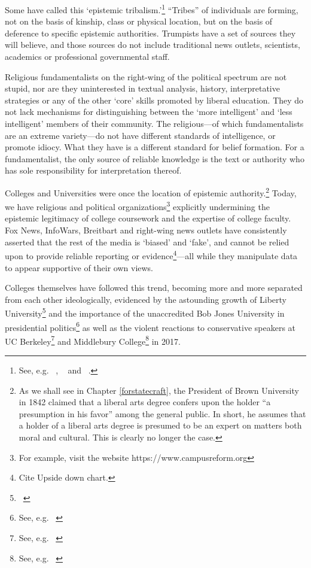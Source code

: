 Some have called this `epistemic tribalism.'\footnote{See, e.g. ~\citep{Spencer:2013hm}, ~\citep{Brayton:2017up} and ~\citep{Roberts:2017up}.} ``Tribes'' of individuals are forming, not on the basis of kinship, class or physical location, but on the basis of deference to specific epistemic authorities. Trumpists have a set of sources they will believe, and those sources do not include traditional news outlets, scientists, academics or professional governmental staff.

Religious fundamentalists on the right-wing of the political spectrum are not stupid, nor are they uninterested in textual analysis, history, interpretative strategies or any of the other `core' skills promoted by liberal education. They do not lack mechanisms for distinguishing between the `more intelligent' and `less intelligent' members of their community. The religious---of which fundamentalists are an extreme variety---do not have different standards of intelligence, or promote idiocy. What they have is a different standard for belief formation. For a fundamentalist, the only source of reliable knowledge is the text or authority who has sole responsibility for interpretation thereof. 

Colleges and Universities were once the location of epistemic authority.\footnote{As we shall see in Chapter \ref{forstatecraft}, the President of Brown University in 1842 claimed that a liberal arts degree confers upon the holder ``a presumption in his favor'' among the general public. In short, he assumes that a holder of a liberal arts degree is presumed to be an expert on matters both moral and cultural. This is clearly no longer the case.} Today, we have religious and political organizations\footnote{For example, visit the website https:\slash \slash www.campusreform.org} explicitly undermining the epistemic legitimacy of college coursework and the expertise of college faculty. Fox News, InfoWars, Breitbart and right-wing news outlets have consistently asserted that the rest of the media is `biased' and `fake', and cannot be relied upon to provide reliable reporting or evidence\footnote{Cite Upside down chart.}---all while they manipulate data to appear supportive of their own views.

Colleges themselves have followed this trend, becoming more and more separated from each other ideologically, evidenced by the astounding growth of Liberty University\footnote{~\citep{Grant:2015tv}} and the importance of the unaccredited Bob Jones University in presidential politics\footnote{See, e.g. ~\citep{Cary:2016tw}} as well as the violent reactions to conservative speakers at UC Berkeley\footnote{See, e.g. ~\citep{Park:2017wa}} and Middlebury College\footnote{See, e.g. ~\citep{Krantz:2017wr}} in 2017.

